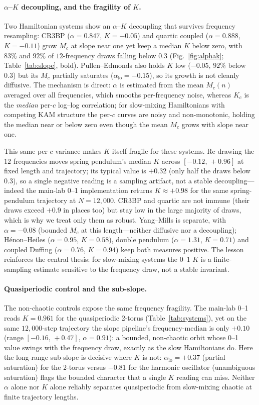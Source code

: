 \documentclass[aip,cha,preprint,amsmath,amssymb,floatfix]{revtex4-2}
\begin{document}
\paragraph{$\alpha$--$K$ decoupling, and the fragility of $K$.}
Two Hamiltonian systems show an $\alpha$--$K$ decoupling that survives frequency
resampling: CR3BP ($\alpha=0.847$, $K=-0.05$) and quartic coupled ($\alpha=0.888$,
$K=-0.11$) grow $M_c$ at slope near one yet keep a median $K$ below zero, with
$83\%$ and $92\%$ of $12$-frequency draws falling below $0.3$
(Fig.~\ref{fig:alphak}; Table~\ref{tab:slope}, bold). Pullen--Edmonds also holds $K$ low ($-0.05$, $92\%$
below $0.3$) but its $M_c$ partially saturates ($\alpha_{\mathrm{lo}}=-0.15$), so
its growth is not cleanly diffusive. The mechanism is direct: $\alpha$ is
estimated from the mean $M_c(n)$ averaged over all frequencies, which smooths
per-frequency noise, whereas $K_c$ is the \emph{median} per-$c$ log--log
correlation; for slow-mixing Hamiltonians with competing KAM structure the
per-$c$ curves are noisy and non-monotonic, holding the median near or below zero
even though the mean $M_c$ grows with slope near one.

This same per-$c$ variance makes $K$ itself fragile for these systems. Re-drawing
the $12$ frequencies moves spring pendulum's median $K$ across $[-0.12,\,+0.96]$
at fixed length and trajectory; its typical value is $+0.32$ (only half the draws
below $0.3$), so a single negative reading is a sampling artifact, not a stable
decoupling---indeed the main-lab 0--1 implementation returns $K\approx+0.98$ for
the same spring-pendulum trajectory at $N=12{,}000$. CR3BP and
quartic are not immune (their draws exceed $+0.9$ in places too) but stay low in
the large majority of draws, which is why we treat only them as robust.
Yang--Mills is separate, with $\alpha=-0.08$ (bounded $M_c$ at this length---neither
diffusive nor a decoupling); H\'{e}non--Heiles ($\alpha=0.95$, $K=0.58$), double
pendulum ($\alpha=1.31$, $K=0.71$) and coupled Duffing ($\alpha=0.76$, $K=0.94$)
keep both measures positive. The lesson reinforces the central thesis: for
slow-mixing systems the 0--1 $K$ is a finite-sampling estimate sensitive to the
frequency draw, not a stable invariant.

\paragraph{Quasiperiodic control and the sub-slope.}
The non-chaotic controls expose the same frequency fragility. The main-lab 0--1
reads $K=0.961$ for the quasiperiodic 2-torus (Table~\ref{tab:systems}), yet on the
same $12{,}000$-step trajectory the slope pipeline's frequency-median is only
$+0.10$ (range $[-0.16,\,+0.47]$, $\alpha=0.91$): a bounded, non-chaotic orbit
whose 0--1 value swings with the frequency draw, exactly as the slow Hamiltonians
do. Here the long-range sub-slope is decisive where $K$ is not:
$\alpha_{\mathrm{lo}}=+0.37$ (partial saturation) for the 2-torus versus $-0.81$
for the harmonic oscillator (unambiguous saturation) flags the bounded character
that a single $K$ reading can miss. Neither $\alpha$ alone nor $K$ alone reliably
separates quasiperiodic from slow-mixing chaotic at finite trajectory lengths.
\end{document}
